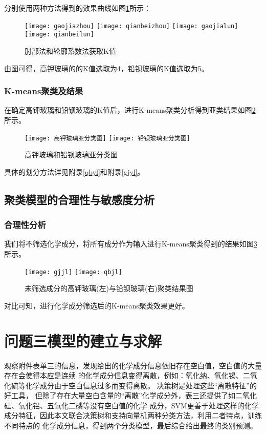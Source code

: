 \documentclass[withoutpreface,bwprint]{cumcmthesis} %
\begin{document}
分别使用两种方法得到的效果曲线如图\ref{qdkz}所示：

\begin{figure}[!h]
	\centering
	\texttt{[image: gaojiazhou]}
	\texttt{[image: qianbeizhou]}
	\texttt{[image: gaojialun]}
	\texttt{[image: qianbeilun]}
	\caption{肘部法和轮廓系数法获取K值}
	\label{qdkz}
\end{figure}

由图可得，高钾玻璃的的K值选取为4，铅钡玻璃的K值选取为5。


\subsubsection{K-means聚类及结果}
在确定高钾玻璃和铅钡玻璃的K值后，进行K-means聚类分析得到亚类结果如图\ref{gjfenyl}所示。

\begin{figure}[!h]
	\centering
	\texttt{[image: 高钾玻璃亚分类图]}
	\texttt{[image: 铅钡玻璃亚分类图]}
	\caption{高钾玻璃和铅钡玻璃亚分类图}
	\label{gjfenyl}
\end{figure}

具体的划分方法详见附录\ref{qbyl}和附录\ref{gjyl}。


\subsection{聚类模型的合理性与敏感度分析}
\subsubsection{合理性分析}

我们将不筛选化学成分，将所有成分作为输入进行K-means聚类得到的结果如图\ref{jljg}所示。
\begin{figure}[!h]
	\centering
	\texttt{[image: gjjl]}
	\texttt{[image: qbjl]}
	\caption{未筛选成分的高钾玻璃(左)与铅钡玻璃(右)聚类结果图}
	\label{jljg}
\end{figure}

对比可知，进行化学成分筛选后的K-means聚类效果更好。

\section{问题三模型的建立与求解}

观察附件表单三的信息，发现给出的化学成分信息依旧存在空白值，空白值的大量存在会使得本应是连续 的化学成分信息变得离散，例如：氧化纳、氧化锡、二氧化硫等化学成分由于空白信息过多而变得离散。 决策树是处理这些“离散特征”的好工具， 但除了存在大量空白含量的“离散”化学成分外，表三还提供了如二氧化硅、氧化铝、五氧化二磷等没有空白值的化学 成分，SVM更善于处理这样的化学成分特征，因此本文联合决策树和支持向量机两种分类方法，利用二者特点，训练不同特点的 化学成分信息，得到两个分类模型，最后综合给出最终的类别预测。
\end{document}
